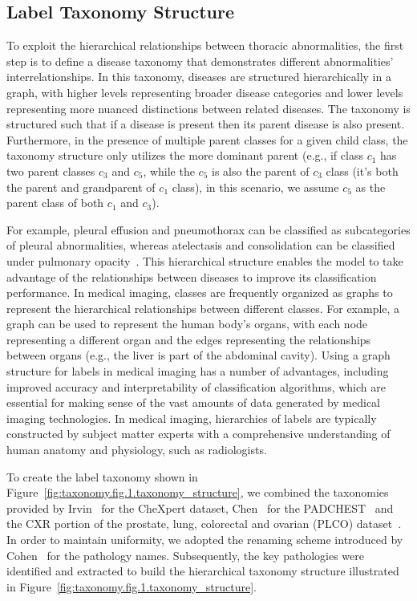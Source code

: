 \documentclass[final,1p,times,authoryear]{elsarticle}
\begin{document}
\subsection{Label Taxonomy Structure}\label{subsec:label-taxonomy-and-hierarchy}
To exploit the hierarchical relationships between thoracic abnormalities, the first step is to define a disease taxonomy that demonstrates different abnormalities' interrelationships. In this taxonomy, diseases are structured hierarchically in a graph, with higher levels representing broader disease categories and lower levels representing more nuanced distinctions between related diseases. The taxonomy is structured such that if a disease is present then its parent disease is also present. Furthermore, in the presence of multiple parent classes for a given child class, the taxonomy structure only utilizes the more dominant parent (e.g., if class $c_1$ has two parent classes $c_3$ and $c_5$, while the $c_5$ is also the parent of $c_3$ class (it's both the parent and grandparent of $c_1$ class), in this scenario, we assume $c_5$ as the parent class of both $c_1$ and $c_3$).

For example, pleural effusion and pneumothorax can be classified as subcategories of pleural abnormalities, whereas atelectasis and consolidation can be classified under pulmonary opacity~\cite{irvin_CheXpert_2019}. This hierarchical structure enables the model to take advantage of the relationships between diseases to improve its classification performance.
In medical imaging, classes are frequently organized as graphs to represent the hierarchical relationships between different classes. For example, a graph can be used to represent the human body's organs, with each node representing a different organ and the edges representing the relationships between organs (e.g., the liver is part of the abdominal cavity). Using a graph structure for labels in medical imaging has a number of advantages, including improved accuracy and interpretability of classification algorithms, which are essential for making sense of the vast amounts of data generated by medical imaging technologies. In medical imaging, hierarchies of labels are typically constructed by subject matter experts with a comprehensive understanding of human anatomy and physiology, such as radiologists.

To create the label taxonomy shown in Figure~\ref{fig:taxonomy.fig.1.taxonomy_structure}, we combined the taxonomies provided by Irvin~\cite{irvin_CheXpert_2019} for the CheXpert dataset, Chen~\cite{chen_Deep_2020} for the PADCHEST~\cite{bustos_Padchest_2020} and the CXR portion of the prostate, lung, colorectal and ovarian (PLCO) dataset~\cite{gohagan_Prostate_2000}.
In order to maintain uniformity, we adopted the renaming scheme introduced by Cohen~\cite{cohen_TorchXRayVision_2022} for the pathology names. Subsequently, the key pathologies were identified and extracted to build the hierarchical taxonomy structure illustrated in Figure~\ref{fig:taxonomy.fig.1.taxonomy_structure}.
\end{document}
